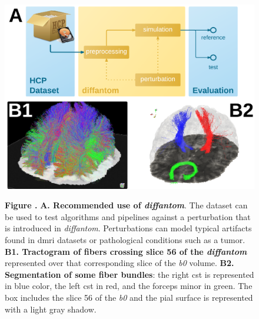\documentclass[english]{frontiers/frontiersSCNS} %
\begin{document}
\begin{figure}[h!]
\begin{center}
\includegraphics[width=\linewidth]{figures/figure02}
\end{center}
\textbf{\label{fig:figure2} Figure . }%
{\textbf{A. Recommended use of \emph{diffantom}}.
The dataset can be used to test algorithms and pipelines against a perturbation that is
  introduced in \emph{diffantom}.
Perturbations can model typical artifacts found in \gls*{dmri} datasets or pathological conditions
  such as a tumor.
\textbf{B1. Tractogram of fibers crossing slice 56 of the \emph{diffantom}} represented over that corresponding
  slice of the \emph{b0} volume. \textbf{B2. Segmentation of some fiber bundles}: the right \gls*{cst} is
  represented in blue color, the left \gls*{cst} in red, and the forceps minor in green.
  The box includes the slice 56 of the \emph{b0} and the pial surface is represented with a light gray shadow.
}
\end{figure}
\end{document}
